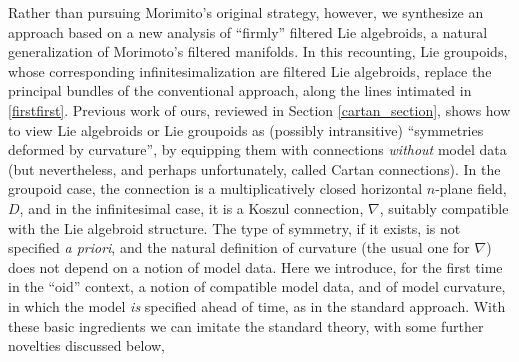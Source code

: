 \documentclass[leqno,12pt]{amsart} %
\begin{document}
Rather than pursuing Morimito's original strategy, however, we synthesize an approach
based on a new analysis of ``firmly'' filtered Lie algebroids, a natural generalization of
Morimoto's filtered manifolds. In this recounting, Lie groupoids, whose corresponding
infinitesimalization are filtered Lie algebroids, replace the principal bundles of the
conventional approach, along the lines intimated in \ref{firstfirst}. Previous work of
ours, reviewed in Section \ref{cartan_section}, shows how to view Lie algebroids or Lie
groupoids as (possibly intransitive) ``symmetries deformed by curvature'', by equipping
them with connections {\em without} model data
\cite{Blaom_06,Blaom_12,Blaom_13,Blaom_16,Blaom_16b} (but nevertheless, and perhaps
unfortunately, called Cartan connections). In the groupoid case, the connection is a
multiplicatively closed horizontal $n$-plane field, $D$, and in the infinitesimal case, it
is a Koszul connection, $\nabla $, suitably compatible with the Lie algebroid
structure. The type of symmetry, if it exists, is not specified {\em a priori}, and the
natural definition of curvature (the usual one for $\nabla $) does not depend on a notion
of model data. Here we introduce, for the first time in the ``oid'' context, a notion of
compatible model data, and of model curvature, in which the model {\em is} specified ahead
of time, as in the standard approach. With these basic ingredients we can imitate the
standard theory, with some further novelties discussed below,
\end{document}
